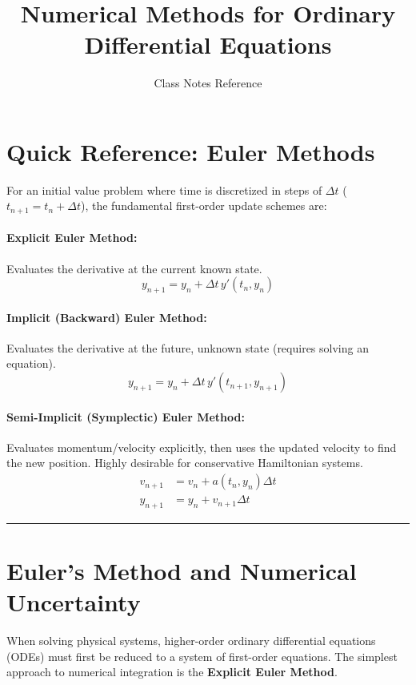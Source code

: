 \documentclass[11pt]{article}
\title{Numerical Methods for Ordinary Differential Equations}
\author{Class Notes Reference}
\date{}
\begin{document}
\maketitle

\section*{Quick Reference: Euler Methods}
For an initial value problem where time is discretized in steps of $\Delta t$ ($t_{n+1} = t_n + \Delta t$), the fundamental first-order update schemes are:

\paragraph{Explicit Euler Method:} Evaluates the derivative at the current known state.
\begin{equation}
    y_{n+1} = y_n + \Delta t \, y'(t_n, y_n)
\end{equation}

\paragraph{Implicit (Backward) Euler Method:} Evaluates the derivative at the future, unknown state (requires solving an equation).
\begin{equation}
    y_{n+1} = y_n + \Delta t \, y'(t_{n+1}, y_{n+1})
\end{equation}

\paragraph{Semi-Implicit (Symplectic) Euler Method:} Evaluates momentum/velocity explicitly, then uses the updated velocity to find the new position. Highly desirable for conservative Hamiltonian systems.
\begin{align}
    v_{n+1} &= v_n + a(t_n, y_n) \Delta t \\
    y_{n+1} &= y_n + v_{n+1} \Delta t
\end{align}

\noindent\rule{\textwidth}{0.4pt}

\section{Euler's Method and Numerical Uncertainty}

When solving physical systems, higher-order ordinary differential equations (ODEs) must first be reduced to a system of first-order equations. The simplest approach to numerical integration is the \textbf{Explicit Euler Method}. 
\end{document}
